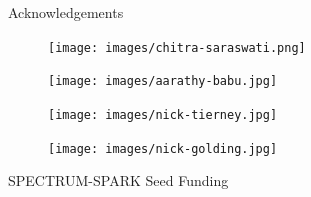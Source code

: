 \documentclass[
  14pt,
  ignorenonframetext,
  aspectratio=169,
]{beamer}
\begin{document}
\begin{frame}{Acknowledgements}
\label{acknowledgements}
\begin{figure}

\begin{minipage}{0.25\linewidth}

\texttt{[image: images/chitra-saraswati.png]}

\end{minipage}%
%
\begin{minipage}{0.25\linewidth}

\texttt{[image: images/aarathy-babu.jpg]}

\end{minipage}%
%
\begin{minipage}{0.25\linewidth}

\texttt{[image: images/nick-tierney.jpg]}

\end{minipage}%
%
\begin{minipage}{0.25\linewidth}

\texttt{[image: images/nick-golding.jpg]}

\end{minipage}%

\end{figure}%

SPECTRUM-SPARK Seed Funding
\end{frame}
\end{document}

